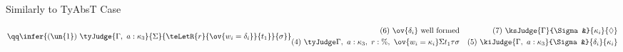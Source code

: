 \begin{flushleft}
\clearpage{}
 \\
 \\

Similarly to TyAbsT Case

\bigskip

$$
\qq	\infer
	{ (\un{1}) \
	  \tyJudge
		{\Gamma, \ a : \kappa_3}
		{\Sigma}
		{\teLetR{r}{\ov{w_i = \delta_i}}{t_1}}
		{\sigma}
	}
	{
	  \begin{aligned}
		(6) \
		\ov{\delta_i} \ \text{well formed}
		\\
	  	(4) \
	  	\tyJudge
			{\Gamma, \ a : \kappa_3, \ r : \%, \ \ov{w_i = \kappa_i}}
			{\Sigma}
			{t_1}
			{\tau}
			{\sigma}
	  \end{aligned}
	  \quad
	  \begin{aligned}
		(7) \
	        \ksJudge
			{\Gamma}
			{\Sigma&}
			{\kappa_i}
			{\Diamond}
		\\
	        (5) \
	  	\kiJudge
			{\Gamma, \ a : \kappa_3}
			{\Sigma&}
			{\delta_i}
			{\kappa_i}
	  \end{aligned}
	}
$$


\end{flushleft}
